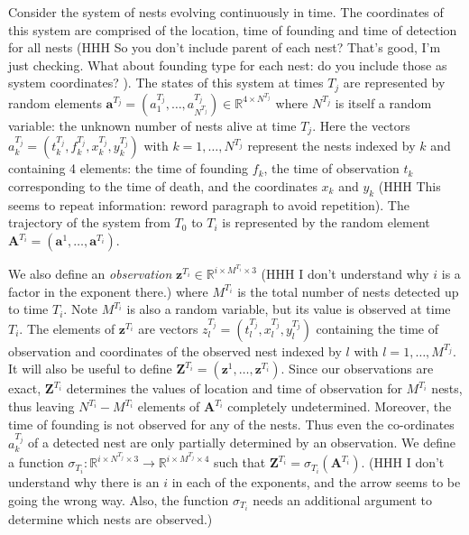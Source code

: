 \documentclass{article}
\renewcommand{\vec}[1]{\mathbf{#1}}
\begin{document}
Consider the system of nests evolving continuously in time. The coordinates of this system are comprised of the location, time of founding and time of detection for all nests (HHH So you don't include parent of each nest? That's good, I'm just checking. What about founding type for each nest: do you include those as system coordinates? ). The states of this system at times $T_j$ are represented by random elements $\vec{a}^{T_j} = (a^{T_j}_1, \dots, a^{T_j}_{N^{T_j}}) \in \mathbb{R}^{4\times N^{T_j}}$ where $N^{T_j}$ is itself a random variable: the unknown number of nests alive at time $T_j$. Here the vectors $a^{T_j}_k = (t_k^{T_j}, f_k^{T_j}, x_k^{T_j}, y_k^{T_j})$ with $k = 1, \dots , N^{T_j}$ represent the nests indexed by $k$ and containing 4 elements: the time of founding $f_k$, the time of observation $t_k$ corresponding to the time of death, and the coordinates $x_k$ and $y_k$ (HHH This seems to repeat information: reword paragraph to avoid repetition).
The trajectory of the system from $T_0$ to $T_i$ is represented by the random element $\vec{A}^{T_i} = (\vec{a}^1, \dots, \vec{a}^{T_i})$.

We also define an \textit{observation} $\vec{z}^{T_i} \in \mathbb{R}^{i \times M^{T_i} \times 3}$ (HHH I don't understand why $i$ is a factor in the exponent there.) where $M^{T_i}$ is the total number of nests detected up to time $T_i$. Note $M^{T_i}$ is also a random variable, but its value is observed at time $T_i$. The elements of $\vec{z}^{T_i}$ are vectors $z^{T_j}_l = (t^{T_j}_l, x^{T_j}_l, y^{T_j}_l)$ containing the time of observation and coordinates of the observed nest indexed by $l$ with $l = 1, \dots, M^{T_j}$. It will also be useful to define $\vec{Z}^{T_i} = (\vec{z}^1, \dots, \vec{z}^{T_i})$. Since our observations are exact, $\vec{Z}^{T_i}$ determines the values of location and time of observation for $M^{T_i}$ nests, thus leaving $N^{T_i}-M^{T_i}$ elements of $\vec{A}^{T_i}$ completely undetermined. Moreover, the time of founding is not observed for any of the nests. Thus even the co-ordinates $a^{T_j}_k$ of a detected nest are only partially determined by an observation. We define a function $\sigma_{T_i}: \mathbb{R}^{i\times N^{T_j}\times 3} \rightarrow \mathbb{R}^{i\times M^{T_j}\times 4}$ such that $\vec{Z}^{T_i} = \sigma_{T_i}(\vec{A}^{T_i})$. (HHH I don't understand why there is an $i$ in each of the exponents, and the arrow seems to be going the wrong way. Also, the function $\sigma_{T_i}$ needs an additional argument to determine which nests are observed.)
\end{document}
